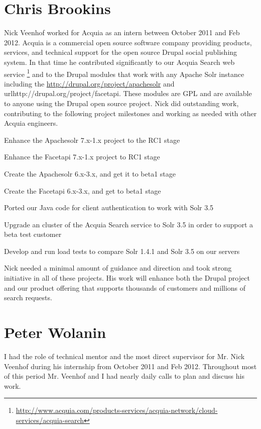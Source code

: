 \section{Chris Brookins}
Nick Veenhof worked for Acquia as an intern between October 2011 and Feb 2012.  Acquia is a commercial open source software company providing products, services, and technical support for the open source Drupal social publishing system.  In that time he contributed significantly to our Acquia Search web service \footnote{\url{http://www.acquia.com/products-services/acquia-network/cloud-services/acquia-search}} and to the Drupal modules that work with any Apache Solr instance including the \url{http://drupal.org/project/apachesolr} and url{http://drupal.org/project/facetapi}.  These modules are GPL and are available to anyone using the Drupal open source project. Nick did outstanding work, contributing to the following project milestones and working as needed with other Acquia engineers.

\begin{packed_itemize}
\item Enhance the Apachesolr 7.x-1.x project to the RC1 stage
\item Enhance the Facetapi 7.x-1.x project to RC1 stage
\item Create the Apachesolr 6.x-3.x, and get it to beta1 stage
\item Create the Facetapi 6.x-3.x, and get to beta1 stage
\item Ported our Java code for client authentication to work with Solr 3.5
\item Upgrade an cluster of the Acquia Search service to Solr 3.5 in order to support a beta test customer
\item Develop and run load tests to compare Solr 1.4.1 and Solr 3.5 on our servers
\end{packed_itemize}
Nick needed a minimal amount of guidance and direction and took strong initiative in all of these projects. His work will enhance both the Drupal project and our product offering that supports thousands of customers and millions of search requests.

\section{Peter Wolanin}
I had the role of technical mentor and the most direct supervisor for
Mr. Nick Veenhof during his internship from October 2011 and Feb 2012.
Throughout most of this period Mr. Veenhof and I had nearly daily
calls to plan and discuss his work.


